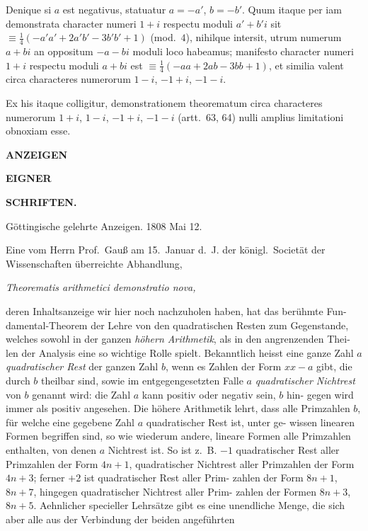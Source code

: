 \documentclass[12pt,a4paper]{article}
\begin{document}
Denique si $a$ est negativus, statuatur $a=-a'$, $b=-b'$. Quum itaque per iam demonstrata character numeri $1+i$ respectu moduli $a'+b'i$ sit $\equiv\frac{1}{4}(-a'a'+2a'b'-3b'b'+1)$ (mod.~$4$), nihilque intersit, utrum numerum $a+bi$ an oppositum $-a-bi$ moduli loco habeamus; manifesto character numeri $1+i$ respectu moduli $a+bi$ est $\equiv\frac{1}{4}(-aa+2ab-3bb+1)$, et similia valent circa characteres numerorum $1-i$, $-1+i$, $-1-i$.

Ex his itaque colligitur, demonstrationem theorematum circa characteres numerorum $1+i$, $1-i$, $-1+i$, $-1-i$ (artt.~63, 64) nulli amplius limitationi obnoxiam esse.

\newpage
{}

\begin{center}
\Large\textbf{ANZEIGEN}
\end{center}

\begin{center}
\textbf{EIGNER}
\end{center}

\begin{center}
\Large\textbf{SCHRIFTEN.}
\end{center}

\vspace{2cm}

\begin{center}
Göttingische gelehrte Anzeigen. 1808 Mai 12.
\end{center}

Eine vom Herrn Prof.~Gauß am 15.~Januar d.~J. der königl.~Societät der
Wissenschaften überreichte Abhandlung,

\begin{center}
\textit{Theorematis arithmetici demonstratio nova,}
\end{center}

deren Inhaltsanzeige wir hier noch nachzuholen haben, hat das berühmte Fun-
damental-Theorem der Lehre von den quadratischen Resten zum Gegenstande,
welches sowohl in der ganzen \textit{höhern Arithmetik}, als in den angrenzenden Thei-
len der Analysis eine so wichtige Rolle spielt. Bekanntlich heisst eine ganze
Zahl $a$ \textit{quadratischer Rest} der ganzen Zahl $b$, wenn es Zahlen der Form $xx-a$
gibt, die durch $b$ theilbar sind, sowie im entgegengesetzten Falle $a$ \textit{quadratischer
Nichtrest} von $b$ genannt wird: die Zahl $a$ kann positiv oder negativ sein, $b$ hin-
gegen wird immer als positiv angesehen. Die höhere Arithmetik lehrt, dass alle
Primzahlen $b$, für welche eine gegebene Zahl $a$ quadratischer Rest ist, unter ge-
wissen linearen Formen begriffen sind, so wie wiederum andere, lineare Formen
alle Primzahlen enthalten, von denen $a$ Nichtrest ist. So ist z.~B. $-1$
quadratischer Rest aller Primzahlen der Form $4n+1$, quadratischer Nichtrest
aller Primzahlen der Form $4n+3$; ferner $+2$ ist quadratischer Rest aller Prim-
zahlen der Form $8n+1$, $8n+7$, hingegen quadratischer Nichtrest aller Prim-
zahlen der Formen $8n+3$, $8n+5$. Aehnlicher specieller Lehrsätze gibt es eine
unendliche Menge, die sich aber alle aus der Verbindung der beiden angeführten
\end{document}
